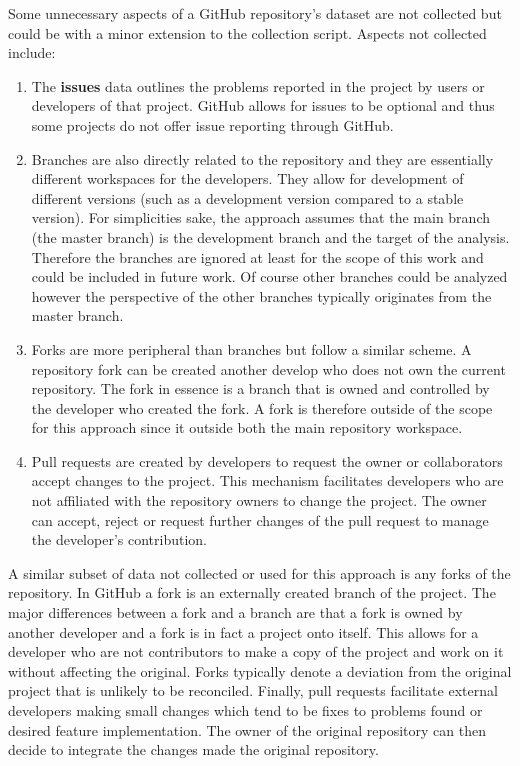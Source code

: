 Some unnecessary aspects of a GitHub repository's dataset are not collected but could be with a minor extension to the collection script. Aspects not collected include:
\begin{enumerate}
\item The \textbf{issues} data outlines the problems reported in the project by users or developers of that project. GitHub allows for issues to be optional and thus some projects do not offer issue reporting through GitHub.
\item Branches are also directly related to the repository and they are essentially different workspaces for the developers. They allow for development of different versions (such as a development version compared to a stable version). For simplicities sake, the approach assumes that the main branch (the master branch) is the development branch and the target of the analysis. Therefore the branches are ignored at least for the scope of this work and could be included in future work. Of course other branches could be analyzed however the perspective of the other branches typically originates from the master branch.
\item Forks are more peripheral than branches but follow a similar scheme. A repository fork can be created another develop who does not own the current repository. The fork in essence is a branch that is owned and controlled by the developer who created the fork. A fork is therefore outside of the scope for this approach since it outside both the main repository workspace.
\item Pull requests are created by developers to request the owner or collaborators accept changes to the project. This mechanism facilitates developers who are not affiliated with the repository owners to change the project. The owner can accept, reject or request further changes of the pull request to manage the developer's contribution.
\end{enumerate}

A similar subset of data not collected or used for this approach is any forks of the repository. In GitHub a fork is an externally created branch of the project. The major differences between a fork and a branch are that a fork is owned by another developer and a fork is in fact a project onto itself. This allows for a developer who are not contributors to make a copy of the project and work on it without affecting the original. Forks typically denote a deviation from the original project that is unlikely to be reconciled. Finally, pull requests facilitate external developers making small changes which tend to be fixes to problems found or desired feature implementation. The owner of the original repository can then decide to integrate the changes made the original repository.


